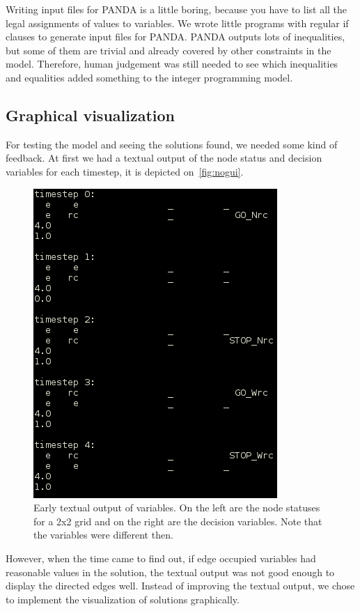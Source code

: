 Writing input files for PANDA is a little boring, because you have to list all
the legal assignments of values to variables. We wrote little programs with
regular if clauses to generate input files for PANDA. PANDA outputs lots of
inequalities, but some of them are trivial and already covered by other
constraints in the model. Therefore, human judgement was still needed to see
which inequalities and equalities added something to the integer programming
model.
\subsection{Graphical visualization}
For testing the model and seeing the solutions found, we needed some kind of
feedback. At first we had a textual output of the node status and decision
variables for each timestep, it is depicted on~\autoref{fig:nogui}.

\begin{figure}[h]
    \begin{center}
	\includegraphics[scale=0.7]{fig/nogui.png}
        \caption{Early textual output of variables. On the left are the node
            statuses for a 2x2 grid and on the right are the decision variables.
        Note that the variables were different then.}
        \label{fig:nogui}
    \end{center}
\end{figure}

However, when the time came to find out, if edge occupied variables had
reasonable values in the solution, the textual output was not good enough to
display the directed edges well. Instead of improving the textual output, we
chose to implement the visualization of solutions graphically.

